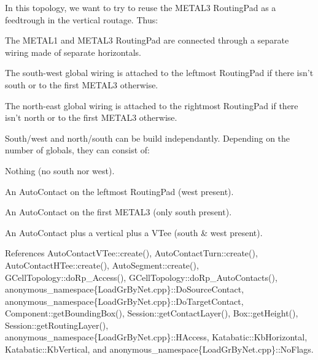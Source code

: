 In this topology, we want to try to reuse the {\ttfamily M\-E\-T\-A\-L3} Routing\-Pad as a feedtrough in the vertical routage. Thus\-:
\begin{DoxyItemize}
\item The {\ttfamily M\-E\-T\-A\-L1} and {\ttfamily M\-E\-T\-A\-L3} Routing\-Pad are connected through a separate wiring made of separate horizontals.
\item The south-\/west global wiring is attached to the leftmost Routing\-Pad if there isn't south or to the first {\ttfamily M\-E\-T\-A\-L3} otherwise.
\item The north-\/east global wiring is attached to the rightmost Routing\-Pad if there isn't north or to the first {\ttfamily M\-E\-T\-A\-L3} otherwise.
\end{DoxyItemize}

South/west and north/south can be build independantly. Depending on the number of globals, they can consist of\-:
\begin{DoxyItemize}
\item Nothing (no south nor west).
\item An Auto\-Contact on the leftmost Routing\-Pad (west present).
\item An Auto\-Contact on the first {\ttfamily M\-E\-T\-A\-L3} (only south present).
\item An Auto\-Contact plus a vertical plus a V\-Tee (south \& west present).
\end{DoxyItemize}

 

References Auto\-Contact\-V\-Tee\-::create(), Auto\-Contact\-Turn\-::create(), Auto\-Contact\-H\-Tee\-::create(), Auto\-Segment\-::create(), G\-Cell\-Topology\-::do\-Rp\-\_\-\-Access(), G\-Cell\-Topology\-::do\-Rp\-\_\-\-Auto\-Contacts(), anonymous\-\_\-namespace\{\-Load\-Gr\-By\-Net.\-cpp\}\-::\-Do\-Source\-Contact, anonymous\-\_\-namespace\{\-Load\-Gr\-By\-Net.\-cpp\}\-::\-Do\-Target\-Contact, Component\-::get\-Bounding\-Box(), Session\-::get\-Contact\-Layer(), Box\-::get\-Height(), Session\-::get\-Routing\-Layer(), anonymous\-\_\-namespace\{\-Load\-Gr\-By\-Net.\-cpp\}\-::\-H\-Access, Katabatic\-::\-Kb\-Horizontal, Katabatic\-::\-Kb\-Vertical, and anonymous\-\_\-namespace\{\-Load\-Gr\-By\-Net.\-cpp\}\-::\-No\-Flags.

